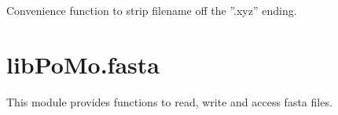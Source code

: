 \documentclass[letterpaper,10pt,english]{sphinxmanual}
\begin{document}
\begin{fulllineitems}
\label{seqbase:libPoMo.seqbase.stripFName}
Convenience function to strip filename off the ''.xyz'' ending.

\end{fulllineitems}

\label{fasta:module-libPoMo.fasta}

\section{libPoMo.fasta}
\label{fasta::doc}\label{fasta:libpomo-fasta}
This module provides functions to read, write and access fasta files.
\end{document}
